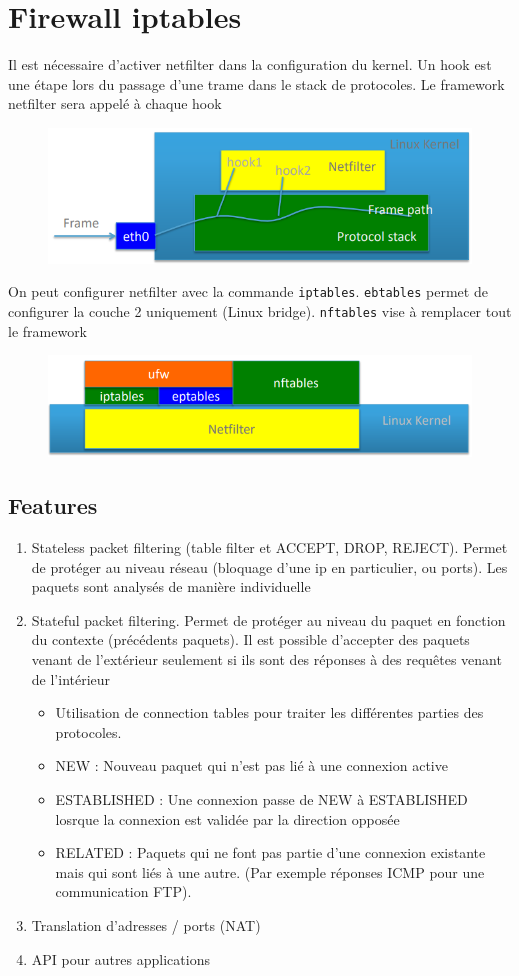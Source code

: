 \documentclass[resume]{subfiles}
\begin{document}
\section{Firewall iptables}
Il est nécessaire d'activer netfilter dans la configuration du kernel. Un hook est une étape lors du passage d'une trame dans le stack de protocoles. Le framework netfilter sera appelé à chaque hook
\begin{figure}[H]
\centering
\includegraphics[width=0.8\columnwidth]{img_6.png}
\end{figure}
On peut configurer netfilter avec la commande \verb!iptables!. \verb!ebtables! permet de configurer la couche 2 uniquement (Linux bridge). \verb!nftables! vise à remplacer tout le framework
\begin{figure}[H]
\centering
\includegraphics[width=0.6\columnwidth]{img_7.png}
\end{figure}
\subsection{Features}
\begin{enumerate}
\item Stateless packet filtering (table filter et ACCEPT, DROP, REJECT). Permet de protéger au niveau réseau (bloquage d'une ip en particulier, ou ports). Les paquets sont analysés de manière individuelle
\item Stateful packet filtering. Permet de protéger au niveau du paquet en fonction du contexte (précédents paquets). Il est possible d'accepter des paquets venant de l'extérieur seulement si ils sont des réponses à des requêtes venant de l'intérieur
\begin{itemize}
\item Utilisation de connection tables pour traiter les différentes parties des protocoles.
\item NEW : Nouveau paquet qui n'est pas lié à une connexion active
\item ESTABLISHED : Une connexion passe de NEW à ESTABLISHED losrque la connexion est validée par la direction opposée
\item RELATED : Paquets qui ne font pas partie d'une connexion existante mais qui sont liés à une autre. (Par exemple réponses ICMP pour une communication FTP).
\end{itemize}
\item Translation d'adresses / ports (NAT)
\item API pour autres applications
\end{enumerate}
\end{document}

